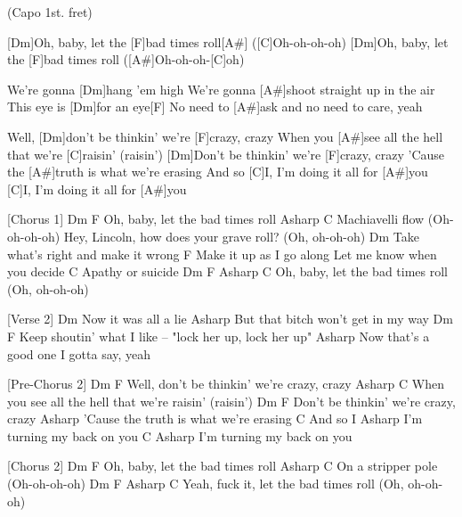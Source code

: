
{\footnotesize(Capo 1st. fret)}

\begin{guitar}
	[Dm]Oh, baby, let the [F]bad times roll[A#] ([C]Oh-oh-oh-oh)
	[Dm]Oh, baby, let the [F]bad times roll ([A#]Oh-oh-oh-[C]oh)
	
	We're gonna [Dm]hang 'em high
	We’re gonna [A#]shoot straight up in the air
	This eye is [Dm]for an eye[F]{}
	No need to [A#]ask and no need to care, yeah
	
	Well, [Dm]don't be thinkin' we're [F]crazy, crazy
	When you [A#]see all the hell that we're [C]raisin' (raisin')
	[Dm]Don't be thinkin' we're [F]crazy, crazy
	'Cause the [A#]truth is what we're erasing
	And so [C]I, I’m doing it all for [A#]you
	[C]I, I'm doing it all for [A#]you
	
	
	[Chorus 1]
	Dm               F
	Oh, baby, let the bad times roll
	Asharp           C
	Machiavelli flow (Oh-oh-oh-oh)
	Hey, Lincoln, how does your grave roll? (Oh, oh-oh-oh)
	Dm
	Take what’s right and make it wrong
	F
	Make it up as I go along
	Let me know when you decide
	C
	Apathy or suicide
	Dm               F              Asharp         C
	Oh, baby, let the bad times roll (Oh, oh-oh-oh)
	
	
	[Verse 2]
	Dm
	Now it was all a lie
	Asharp
	But that bitch won’t get in my way
	Dm                     F
	Keep shoutin’ what I like – "lock her up, lock her up"
	Asharp
	Now that’s a good one I gotta say, yeah
	
	
	[Pre-Chorus 2]
	Dm                     F
	Well, don't be thinkin' we're crazy, crazy
	Asharp                                      C
	When you see all the hell that we're raisin' (raisin')
	Dm                     F
	Don't be thinkin' we're crazy, crazy
	Asharp
	'Cause the truth is what we're erasing
	C
	And so I
	Asharp
	I’m turning my back on you
	C                     Asharp
	I’m turning my back on you
	
	
	[Chorus 2]
	Dm               F
	Oh, baby, let the bad times roll
	Asharp              C
	On a stripper pole (Oh-oh-oh-oh)
	Dm                    F              Asharp         C
	Yeah, fuck it, let the bad times roll (Oh, oh-oh-oh)
	

\end{guitar}
